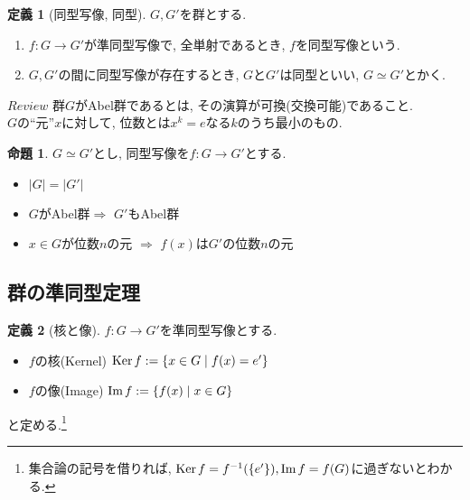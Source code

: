 \documentclass[a4j,dvipdfmx]{jsarticle}
\newcommand{\Ker}{{\rm{Ker}}\hspace{0.5mm}}
\renewcommand{\Im}{{\rm{Im}}\hspace{0.5mm}}
\theoremstyle{definition}
\newtheorem{definition}{定義}
\theoremstyle{definition}
\theoremstyle{definition}
\newtheorem{proposition}{命題}
\begin{document}
            \begin{definition}[同型写像, 同型]
                $G,G'$を群とする.
                \begin{enumerate}
                    \item $f:G\to G'$が準同型写像で, 全単射であるとき, $f$を同型写像という.
                    \item $G,G'$の間に同型写像が存在するとき, $G$と$G'$は同型といい, $G\simeq G'$とかく.
                \end{enumerate}
            \end{definition}

            \begin{itembox}[l]{$Review$}
                群$G$がAbel群であるとは, その演算が可換(交換可能)であること.\\
                $G$の``元''$x$に対して, 位数とは$x^{k}=e$なる$k$のうち最小のもの.
            \end{itembox}

            \begin{proposition}
                $G\simeq G'$とし, 同型写像を$f:G\to G'$とする.
                \begin{itemize}
                    \item $|G|=|G'|$
                    \item $G$がAbel群$\Rightarrow$ $G'$もAbel群
                    \item $x\in G$が位数$n$の元 $\Rightarrow$ $f(x)$は$G'$の位数$n$の元
                \end{itemize}
            \end{proposition}
        \clearpage

        \subsection*{群の準同型定理}
            \begin{definition}[核と像]
                $f:G\to G'$を準同型写像とする.
                \begin{itemize}
                    \item $f$の核(Kernel) $\Ker f:=\{x\in G\mid f(x)=e'\}$
                    \item $f$の像(Image) $\Im f:=\{f(x)\mid x\in G\}$
                \end{itemize}
                と定める.\footnote{集合論の記号を借りれば, $\Ker f=f^{-1}(\{e'\}),\Im f=f(G)$に過ぎないとわかる.}
            \end{definition}
\end{document}

